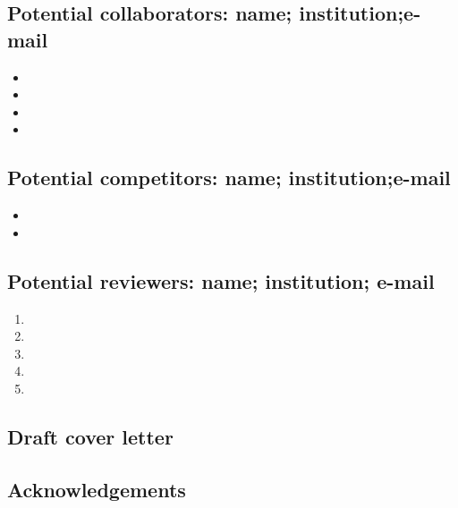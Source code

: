 \documentclass[11pt,letterpaper]{article}
\begin{document}
\subsection{Potential collaborators: name; institution;e-mail}
\label{sec:org9ea0fe7}


\begin{itemize}
\item 

\item 

\item 

\item 
\end{itemize}

\subsection{Potential competitors: name; institution;e-mail}
\label{sec:orgfffb2d0}


\begin{itemize}
\item 

\item 
\end{itemize}

\subsection{Potential reviewers: name; institution; e-mail}
\label{sec:orga5a0a69}


\begin{enumerate}
\item 

\item 

\item 

\item 

\item 
\end{enumerate}

\subsection{Draft cover letter}
\label{sec:org7fef497}



\subsection{Acknowledgements}
\label{sec:org1c1b668}
\end{document}
